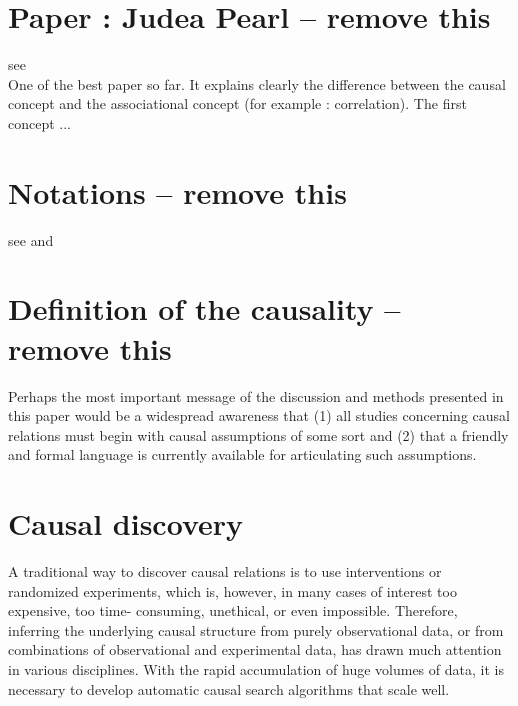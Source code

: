 \documentclass{article}
\begin{document}
\newpage 

\section{Paper : Judea Pearl -- remove this}

see \cite{pearl2010mathematics} \\
One of the best paper so far. It explains clearly the difference between the causal concept and the associational concept (for example : correlation). The first concept ...




\section{Notations -- remove this}
see \cite{yao2020survey} and \cite{hernan2020causal}



\section{Definition of the causality -- remove this}

Perhaps the most important message of the discussion and methods presented in this paper would be a widespread awareness that (1) all studies concerning causal relations must begin with causal assumptions of some sort and (2) that a friendly and formal language is currently available for articulating such assumptions.\cite{pearl2010mathematics}

\cite{rubin2005causal}


\newpage

\section{Causal discovery}

A traditional way to discover causal relations is to use interventions or randomized experiments, which is, however, in many cases of interest too expensive, too time- consuming, unethical, or even impossible. Therefore, inferring the underlying causal structure from purely observational data, or from combinations of observational and experimental data, has drawn much attention in various disciplines. With the rapid accumulation of huge volumes of data, it is necessary to develop automatic causal search algorithms that scale well.\cite{10.3389/fgene.2019.00524}
\end{document}
